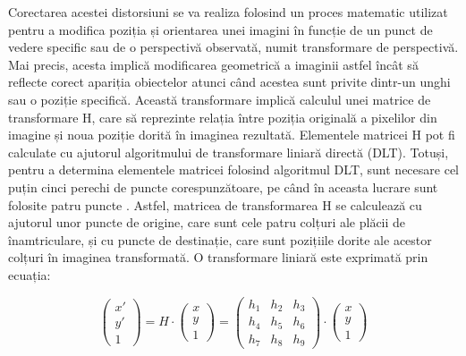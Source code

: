 \documentclass[12pt]{article}
\begin{document}
Corectarea acestei distorsiuni se va realiza folosind un proces matematic utilizat pentru a modifica poziția și orientarea unei imagini \^{i}n funcție de un punct de vedere specific sau de o perspectiv\u{a} observat\u{a}, numit transformare de perspectiv\u{a}. Mai precis, acesta implic\u{a} modificarea geometric\u{a} a imaginii astfel \^{i}nc\^{a}t s\u{a} reflecte corect apariția obiectelor atunci c\^{a}nd acestea sunt privite dintr-un unghi sau o poziție specific\u{a}. Aceast\u{a} transformare implic\u{a} calculul unei matrice de transformare H, care s\u{a} reprezinte relația \^{i}ntre poziția original\u{a} a pixelilor din imagine și noua poziție dorit\u{a} \^{i}n imaginea rezultat\u{a}. Elementele matricei H pot fi calculate cu ajutorul algoritmului de transformare liniar\u{a} direct\u{a} (DLT). Totuși, pentru a determina elementele matricei folosind algoritmul DLT, sunt necesare cel puțin cinci perechi de puncte corespunz\u{a}toare, pe c\^{a}nd \^{i}n aceasta lucrare sunt folosite patru puncte \cite{undistortion}. Astfel, matricea de transformarea H se calculeaz\u{a} cu ajutorul unor puncte de origine, care sunt cele patru colțuri ale pl\u{a}cii de \^{i}namtriculare, și cu puncte de destinație, care sunt pozițiile dorite ale acestor colțuri \^{i}n imaginea transformat\u{a}. O transformare liniar\u{a} este exprimat\u{a} prin ecuația:

\begin{equation}
\begin{pmatrix} x' \\ y' \\ 1 \end{pmatrix} = H \cdot \begin{pmatrix} x \\ y \\ 1 \end{pmatrix} = \begin{pmatrix} h_1 & h_2 & h_3 \\ h_4 & h_5 & h_6 \\ h_7 & h_8 & h_9 \end{pmatrix} \cdot \begin{pmatrix} x \\ y \\ 1 \end{pmatrix}
\end{equation}
\end{document}
